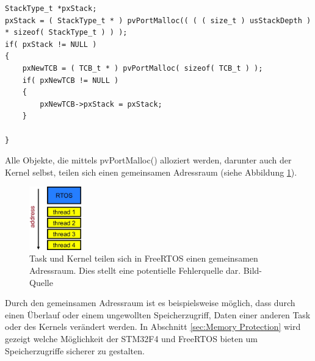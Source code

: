 \begin{lstlisting}[caption={FreeRTOS Source von xTaskCreate() aus Task.c. Jede Task besitzt einen Stack und einen Task Control Block, beide werden beim Aufruf von xTaskCreate (Zeile 5 und Zeile 11) erstellt.}, linewidth=8cm,captionpos=b, label=lst:xTaskCreate, float=htb]
StackType_t *pxStack;
pxStack = ( StackType_t * ) pvPortMalloc(( ( ( size_t ) usStackDepth ) 
* sizeof( StackType_t ) ) );
if( pxStack != NULL )
{
	pxNewTCB = ( TCB_t * ) pvPortMalloc( sizeof( TCB_t ) );
	if( pxNewTCB != NULL )
	{
		pxNewTCB->pxStack = pxStack;
	}

}
\end{lstlisting}
Alle Objekte, die mittels pvPortMalloc() alloziert werden, darunter auch der Kernel selbst, teilen sich einen gemeinsamen Adressraum (siehe Abbildung \ref{fig:AddressSpace}). 
\begin{figure}[hbt]
	\centering
		\includegraphics[width=0.2\textwidth]{Pictures/EmbeddedCom/addressSpace.jpg}
	\caption{Task und Kernel teilen sich in FreeRTOS einen gemeinsamen Adressraum. Dies stellt eine potentielle Fehlerquelle dar. Bild-Quelle~\protect{}}
	\label{fig:AddressSpace}
\end{figure} 
Durch den gemeinsamen Adressraum ist es beispielsweise mög\-lich, dass durch einen Überlauf oder einem ungewollten Speicherzugriff, Daten einer anderen Task oder des Kernels ver\-än\-dert werden.   
In Abschnitt \ref{sec:Memory Protection} wird gezeigt welche Mög\-lich\-keit der STM32F4 und FreeRTOS bieten um Speicherzugriffe sicherer zu gestalten.    
